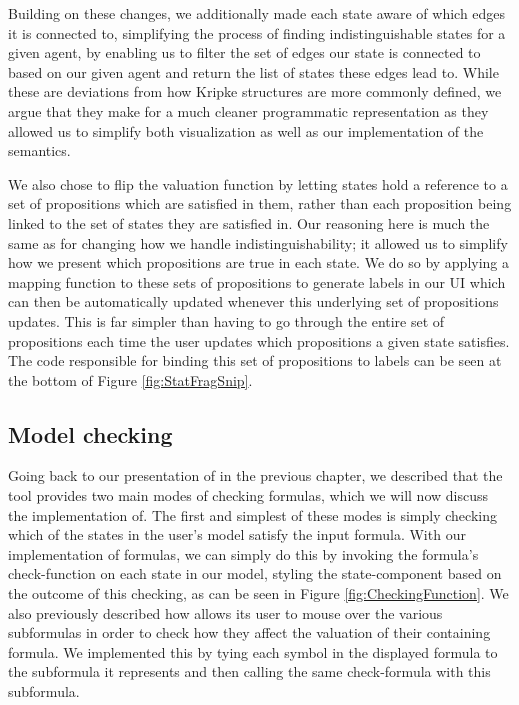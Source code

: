 Building on these changes, we additionally made each state aware of which edges it is connected to, simplifying the process of finding indistinguishable states for a given agent, by enabling us to filter the set of edges our state is connected to based on our given agent and return the list of states these edges lead to. While these are deviations from how Kripke structures are more commonly defined, we argue that they make for a much cleaner programmatic representation as they allowed us to simplify both visualization as well as our implementation of the semantics.

We also chose to flip the valuation function by letting states hold a reference to a set of propositions which are satisfied in them, rather than each proposition being linked to the set of states they are satisfied in. Our reasoning here is much the same as for changing how we handle indistinguishability; it allowed us to simplify how we present which propositions are true in each state. We do so by applying a mapping function to these sets of propositions to generate labels in our UI which can then be automatically updated whenever this underlying set of propositions updates. This is far simpler than having to go through the entire set of propositions each time the user updates which propositions a given state satisfies. The code responsible for binding this set of propositions to labels can be seen at the bottom of Figure \ref{fig:StatFragSnip}.


\subsection{Model checking}

Going back to our presentation of \cname{} in the previous chapter, we described that the tool provides two main modes of checking formulas, which we will now discuss the implementation of. The first and simplest of these modes is simply checking which of the states in the user's model satisfy the input formula. With our implementation of formulas, we can simply do this by invoking the formula's check-function on each state in our model, styling the state-component based on the outcome of this checking, as can be seen in Figure \ref{fig:CheckingFunction}. We also previously described how \cname{} allows its user to mouse over the various subformulas in order to check how they affect the valuation of their containing formula. We implemented this by tying each symbol in the displayed formula to the subformula it represents and then calling the same check-formula with this subformula.


